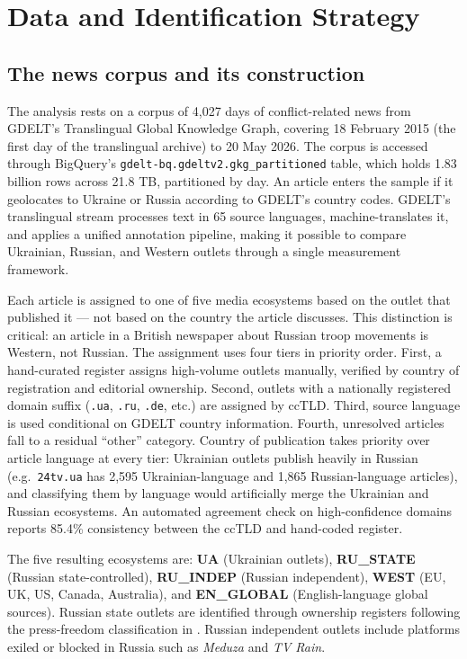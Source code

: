 \documentclass[12pt,a4paper]{article}
\begin{document}
\section{Data and Identification Strategy}
\label{sec:data}

\subsection{The news corpus and its construction}

The analysis rests on a corpus of 4,027 days of conflict-related news from GDELT's Translingual Global Knowledge Graph, covering 18 February 2015 (the first day of the translingual archive) to 20 May 2026. The corpus is accessed through BigQuery's \texttt{gdelt-bq.gdeltv2.gkg\_partitioned} table, which holds 1.83 billion rows across 21.8 TB, partitioned by day. An article enters the sample if it geolocates to Ukraine or Russia according to GDELT's country codes. GDELT's translingual stream processes text in 65 source languages, machine-translates it, and applies a unified annotation pipeline, making it possible to compare Ukrainian, Russian, and Western outlets through a single measurement framework.

Each article is assigned to one of five media ecosystems based on the outlet that published it --- not based on the country the article discusses. This distinction is critical: an article in a British newspaper about Russian troop movements is Western, not Russian. The assignment uses four tiers in priority order. First, a hand-curated register assigns high-volume outlets manually, verified by country of registration and editorial ownership. Second, outlets with a nationally registered domain suffix (\texttt{.ua}, \texttt{.ru}, \texttt{.de}, etc.) are assigned by ccTLD. Third, source language is used conditional on GDELT country information. Fourth, unresolved articles fall to a residual ``other'' category. Country of publication takes priority over article language at every tier: Ukrainian outlets publish heavily in Russian (e.g.\ \texttt{24tv.ua} has 2,595 Ukrainian-language and 1,865 Russian-language articles), and classifying them by language would artificially merge the Ukrainian and Russian ecosystems. An automated agreement check on high-confidence domains reports 85.4\% consistency between the ccTLD and hand-coded register.

The five resulting ecosystems are: \textbf{UA} (Ukrainian outlets), \textbf{RU\_STATE} (Russian state-controlled), \textbf{RU\_INDEP} (Russian independent), \textbf{WEST} (EU, UK, US, Canada, Australia), and \textbf{EN\_GLOBAL} (English-language global sources). Russian state outlets are identified through ownership registers following the press-freedom classification in \citet{bondarenko2024}. Russian independent outlets include platforms exiled or blocked in Russia such as \textit{Meduza} and \textit{TV Rain}.
\end{document}
